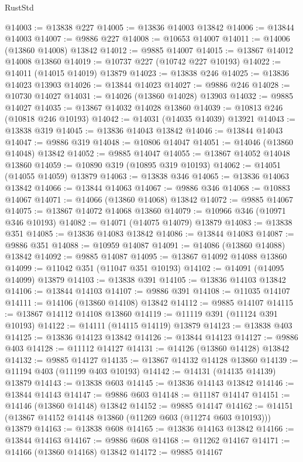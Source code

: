 \begin{lexlean}{RustStd}
\begin{coremodule}
@14003 := @13838 @227
@14005 := @13836 @14003 @13842
@14006 := @13844 @14003
@14007 := @9886 @227
@14008 := @10653 @14007
@14011 := @14006 (@13860 @14008) @13842
@14012 := @9885 @14007
@14015 := @13867 @14012 @14008 @13860
@14019 := @10737 @227 (@10742 @227 @10193)
@14022 := @14011 (@14015 @14019) @13879
@14023 := @13838 @246
@14025 := @13836 @14023 @13903
@14026 := @13844 @14023
@14027 := @9886 @246
@14028 := @10730 @14027
@14031 := @14026 (@13860 @14028) @13903
@14032 := @9885 @14027
@14035 := @13867 @14032 @14028 @13860
@14039 := @10813 @246 (@10818 @246 @10193)
@14042 := @14031 (@14035 @14039) @13921
@14043 := @13838 @319
@14045 := @13836 @14043 @13842
@14046 := @13844 @14043
@14047 := @9886 @319
@14048 := @10806 @14047
@14051 := @14046 (@13860 @14048) @13842
@14052 := @9885 @14047
@14055 := @13867 @14052 @14048 @13860
@14059 := @10890 @319 (@10895 @319 @10193)
@14062 := @14051 (@14055 @14059) @13879
@14063 := @13838 @346
@14065 := @13836 @14063 @13842
@14066 := @13844 @14063
@14067 := @9886 @346
@14068 := @10883 @14067
@14071 := @14066 (@13860 @14068) @13842
@14072 := @9885 @14067
@14075 := @13867 @14072 @14068 @13860
@14079 := @10966 @346 (@10971 @346 @10193)
@14082 := @14071 (@14075 @14079) @13879
@14083 := @13838 @351
@14085 := @13836 @14083 @13842
@14086 := @13844 @14083
@14087 := @9886 @351
@14088 := @10959 @14087
@14091 := @14086 (@13860 @14088) @13842
@14092 := @9885 @14087
@14095 := @13867 @14092 @14088 @13860
@14099 := @11042 @351 (@11047 @351 @10193)
@14102 := @14091 (@14095 @14099) @13879
@14103 := @13838 @391
@14105 := @13836 @14103 @13842
@14106 := @13844 @14103
@14107 := @9886 @391
@14108 := @11035 @14107
@14111 := @14106 (@13860 @14108) @13842
@14112 := @9885 @14107
@14115 := @13867 @14112 @14108 @13860
@14119 := @11119 @391 (@11124 @391 @10193)
@14122 := @14111 (@14115 @14119) @13879
@14123 := @13838 @403
@14125 := @13836 @14123 @13842
@14126 := @13844 @14123
@14127 := @9886 @403
@14128 := @11112 @14127
@14131 := @14126 (@13860 @14128) @13842
@14132 := @9885 @14127
@14135 := @13867 @14132 @14128 @13860
@14139 := @11194 @403 (@11199 @403 @10193)
@14142 := @14131 (@14135 @14139) @13879
@14143 := @13838 @603
@14145 := @13836 @14143 @13842
@14146 := @13844 @14143
@14147 := @9886 @603
@14148 := @11187 @14147
@14151 := @14146 (@13860 @14148) @13842
@14152 := @9885 @14147
@14162 := @14151 (@13867 @14152 @14148 @13860 (@11269 @603 (@11274 @603 @10193))) @13879
@14163 := @13838 @608
@14165 := @13836 @14163 @13842
@14166 := @13844 @14163
@14167 := @9886 @608
@14168 := @11262 @14167
@14171 := @14166 (@13860 @14168) @13842
@14172 := @9885 @14167

\end{coremodule}
\end{lexlean}
